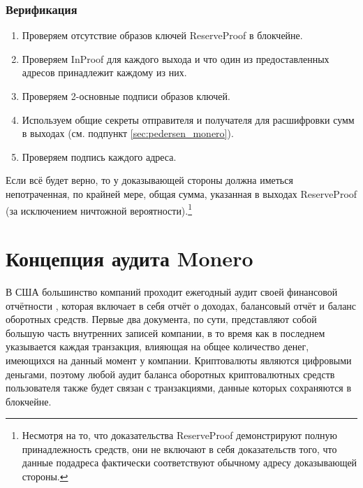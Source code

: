 
\subsubsection*{Верификация}

\begin{enumerate}
    \item Проверяем отсутствие образов ключей ReserveProof в блокчейне.
    \item Проверяем InProof для каждого выхода и что один из предоставленных адресов принад\-лежит каждому из них.
    \item Проверяем 2-основные подписи образов ключей.
    \item Используем общие секреты отправителя и получателя для расшифровки сумм в выходах (см. подпункт \ref{sec:pedersen_monero}).
    \item Проверяем подпись каждого адреса.
\end{enumerate}{}

Если всё будет верно, то у доказывающей стороны должна иметься непотраченная, по крайней мере, общая сумма, указанная в выходах ReserveProof (за исключением ничтожной вероятно\-сти).\footnote{Несмотря на то, что доказательства ReserveProof демонстрируют полную принадлежность средств, они не включают в себя доказательств того, что данные подадреса фактически соответствуют обычному адресу доказывающей стороны.}



\section{Концепция аудита Monero}
\label{sec:proofs-monero-audit-framework}

В США большинство компаний проходит ежегодный аудит своей финансовой отчётности \cite{investopedia-audits}, которая включает в себя отчёт о доходах, балансовый отчёт и баланс оборотных средств. Первые два документа, по сути, представляют собой большую часть внутренних записей компании, в то время как в последнем указывается каждая транзакция, влияющая на общее количество денег, имеющихся на данный момент у компании. Криптовалюты являются цифровыми деньгами, поэтому любой аудит баланса оборотных криптовалютных средств пользователя также будет связан с транзакциями, данные которых сохраняются в блокчейне.

